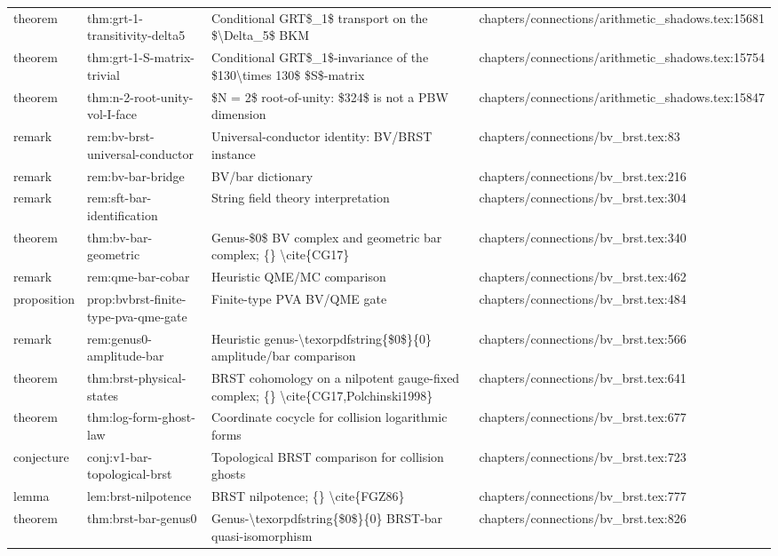\documentclass[11pt]{article}
\begin{document}
\begin{longtable}{L{0.10\textwidth}L{0.26\textwidth}L{0.42\textwidth}L{0.22\textwidth}}
theorem & thm:grt-1-transitivity-delta5 & Cond{}itional GRT\$\_1\$ transport on the \$\textbackslash{}Delta\_5\$ BKM & chapters/connections/arithmetic\_shadows.tex:15681\\
theorem & thm:grt-1-S-matrix-trivial & Cond{}itional GRT\$\_1\$-invariance of the \$130\textbackslash{}times 130\$ \$S\$-matrix & chapters/connections/arithmetic\_shadows.tex:15754\\
theorem & thm:n-2-root-unity-vol-I-face & \$N = 2\$ root-of-unity: \$324\$ is not a PBW dimension & chapters/connections/arithmetic\_shadows.tex:15847\\
remark & rem:bv-brst-universal-conductor & Universal-conductor identity: BV/BRST instance & chapters/connections/bv\_brst.tex:83\\
remark & rem:bv-bar-bridge & BV/bar dictionary & chapters/connections/bv\_brst.tex:216\\
remark & rem:sft-bar-identification & String field theory interpretation & chapters/connections/bv\_brst.tex:304\\
theorem & thm:bv-bar-geometric & Genus-\$0\$ BV complex and geometric bar complex; \{\} \textbackslash{}cite\{CG17\} & chapters/connections/bv\_brst.tex:340\\
remark & rem:qme-bar-cobar & Heur{}istic QME/MC comparison & chapters/connections/bv\_brst.tex:462\\
proposition & prop:bvbrst-finite-type-pva-qme-gate & Finite-type PVA BV/QME gate & chapters/connections/bv\_brst.tex:484\\
remark & rem:genus0-amplitude-bar & Heur{}istic genus-\textbackslash{}texorpdfstring\{\$0\$\}\{0\} amplitude/bar comparison & chapters/connections/bv\_brst.tex:566\\
theorem & thm:brst-physical-states & BRST cohomology on a nilpotent gauge-fixed complex; \{\} \textbackslash{}cite\{CG17,Polchinski1998\} & chapters/connections/bv\_brst.tex:641\\
theorem & thm:log-form-ghost-law & Coordinate cocycle for collision logarithmic forms & chapters/connections/bv\_brst.tex:677\\
conjecture & conj:v1-bar-topological-brst & Topological BRST comparison for collision ghosts & chapters/connections/bv\_brst.tex:723\\
lemma & lem:brst-nilpotence & BRST nilpotence; \{\} \textbackslash{}cite\{FGZ86\} & chapters/connections/bv\_brst.tex:777\\
theorem & thm:brst-bar-genus0 & Genus-\textbackslash{}texorpdfstring\{\$0\$\}\{0\} BRST-bar quasi-isomorphism & chapters/connections/bv\_brst.tex:826\\

\end{longtable}
\end{document}
